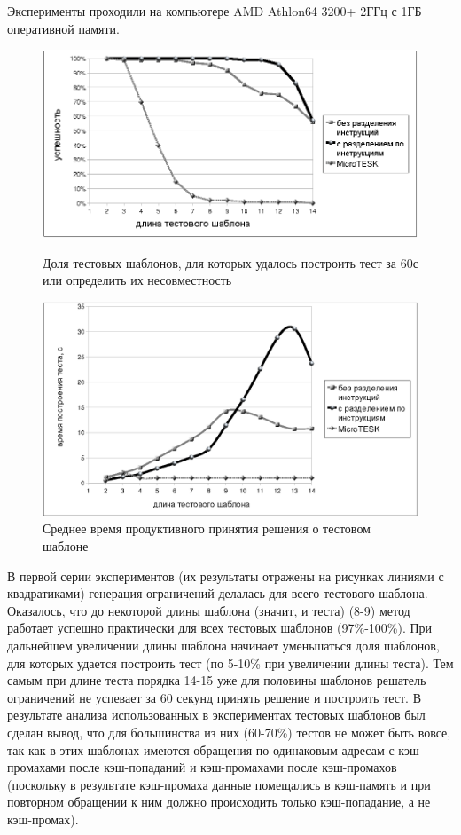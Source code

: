 Эксперименты проходили на компьютере AMD Athlon64 3200+ 2ГГц с 1ГБ оперативной
памяти.

\begin{figure}[p] \center
\parbox[t]{\textwidth}{
  \includegraphics[width=\textwidth]{4.analysis/success_exprmnt}%
\caption{Доля тестовых шаблонов, для которых удалось построить тест за 60с или
определить их несовместность}\label{fig:success_experiment}
}

\vspace{1.5cm}

\parbox[t]{\textwidth}{
  \includegraphics[width=\textwidth]{4.analysis/time_exprmnt}
  \caption{Среднее время продуктивного принятия решения о тестовом
шаблоне}\label{fig:time_experiment}
}
\end{figure}

В первой серии экспериментов (их результаты отражены на рисунках линиями с
квадратиками) генерация ограничений делалась для всего тестового шаблона.
Оказалось, что до некоторой длины шаблона (значит, и теста) (8-9) метод работает
успешно практически для всех тестовых шаблонов (97\%-100\%). При дальнейшем
увеличении длины шаблона начинает уменьшаться доля шаблонов, для которых удается
построить тест (по 5-10\% при увеличении длины теста). Тем самым при длине теста
порядка 14-15 уже для половины шаблонов решатель ограничений не успевает за 60
секунд принять решение и построить тест. В результате анализа использованных в
экспериментах тестовых шаблонов был сделан вывод, что для большинства из них
(60-70\%) тестов не может быть вовсе, так как в этих шаблонах имеются обращения
по одинаковым адресам с кэш-промахами после кэш-попаданий и кэш-промахами после
кэш-промахов (поскольку в результате кэш-промаха данные помещались в кэш-память
и при повторном обращении к ним должно происходить только кэш-попадание, а не
кэш-промах).

